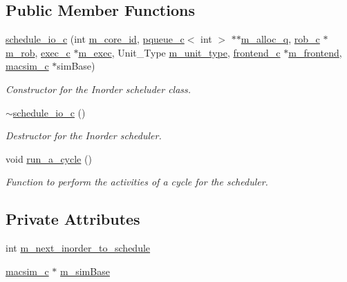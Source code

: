 \subsection*{Public Member Functions}
\begin{DoxyCompactItemize}
\item 
\hyperlink{classschedule__io__c_a57961ab7add32f6e032e7ed03cd37442}{schedule\_\-io\_\-c} (int \hyperlink{classschedule__c_a6c4f8484b3f2dae8255c0ce064f9d46e}{m\_\-core\_\-id}, \hyperlink{classpqueue__c}{pqueue\_\-c}$<$ int $>$ $\ast$$\ast$\hyperlink{classschedule__c_a54abfd4e67cf5e137e5f47ce52e8d903}{m\_\-alloc\_\-q}, \hyperlink{classrob__c}{rob\_\-c} $\ast$\hyperlink{classschedule__c_a440a3a31b8fd41afae103a4b0ed3f49c}{m\_\-rob}, \hyperlink{classexec__c}{exec\_\-c} $\ast$\hyperlink{classschedule__c_a75e32c0fe0d1ad336ada30787fceafd8}{m\_\-exec}, Unit\_\-Type \hyperlink{classschedule__c_a5fd7913b69e838b56da18de2802d8a71}{m\_\-unit\_\-type}, \hyperlink{classfrontend__c}{frontend\_\-c} $\ast$\hyperlink{classschedule__c_a88ee09e9569c248374f0c943a4b73987}{m\_\-frontend}, \hyperlink{classmacsim__c}{macsim\_\-c} $\ast$simBase)
\begin{DoxyCompactList}\small\item\em Constructor for the Inorder scheluder class. \item\end{DoxyCompactList}\item 
\hyperlink{classschedule__io__c_a1dd49046b8bc3795f66cd60c2eefff7f}{$\sim$schedule\_\-io\_\-c} ()
\begin{DoxyCompactList}\small\item\em Destructor for the Inorder scheduler. \item\end{DoxyCompactList}\item 
void \hyperlink{classschedule__io__c_add1ff393e65774fabedc6b4069793c9f}{run\_\-a\_\-cycle} ()
\begin{DoxyCompactList}\small\item\em Function to perform the activities of a cycle for the scheduler. \item\end{DoxyCompactList}\end{DoxyCompactItemize}
\subsection*{Private Attributes}
\begin{DoxyCompactItemize}
\item 
int \hyperlink{classschedule__io__c_a5bf81c5205db201ff80eb9d99da075a3}{m\_\-next\_\-inorder\_\-to\_\-schedule}
\item 
\hyperlink{classmacsim__c}{macsim\_\-c} $\ast$ \hyperlink{classschedule__io__c_a4fd792581e727219c93a1d4ac6707cbd}{m\_\-simBase}
\end{DoxyCompactItemize}


